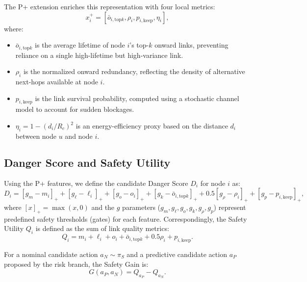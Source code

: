 The P+ extension enriches this representation with four local metrics:
\begin{equation}
    x_i^{+} = [\bar{o}_{i,\mathrm{top}k}, \rho_i, p_{i,\mathrm{keep}}, \eta_i],
\end{equation}
where:
\begin{itemize}
    \item $\bar{o}_{i,\mathrm{top}k}$ is the average lifetime of node $i$'s top-$k$ onward links, preventing reliance on a single high-lifetime but high-variance link.
    \item $\rho_i$ is the normalized onward redundancy, reflecting the density of alternative next-hops available at node $i$.
    \item $p_{i,\mathrm{keep}}$ is the link survival probability, computed using a stochastic channel model to account for sudden blockages.
    \item $\eta_i = 1 - (d_i / R_c)^2$ is an energy-efficiency proxy based on the distance $d_i$ between node $u$ and node $i$.
\end{itemize}

\subsection{Danger Score and Safety Utility}
Using the P+ features, we define the candidate Danger Score $D_i$ for node $i$ as:
\begin{equation}
    D_i = [g_m - m_i]_+ + [g_\ell - \ell_i]_+ + [g_o - o_i]_+ + [g_k - \bar{o}_{i,\mathrm{top}k}]_+ + 0.5[g_\rho - \rho_i]_+ + [g_p - p_{i,\mathrm{keep}}]_+,
\end{equation}
where $[x]_+ = \max(x, 0)$ and the $g$ parameters ($g_m, g_\ell, g_o, g_k, g_\rho, g_p$) represent predefined safety thresholds (gates) for each feature. Correspondingly, the Safety Utility $Q_i$ is defined as the sum of link quality metrics:
\begin{equation}
    Q_i = m_i + \ell_i + o_i + \bar{o}_{i,\mathrm{top}k} + 0.5\rho_i + p_{i,\mathrm{keep}}.
\end{equation}

For a nominal candidate action $a_N \sim \pi_S$ and a predictive candidate action $a_P$ proposed by the risk branch, the Safety Gain is:
\begin{equation}
    G(a_P, a_N) = Q_{a_P} - Q_{a_N}.
\end{equation}

